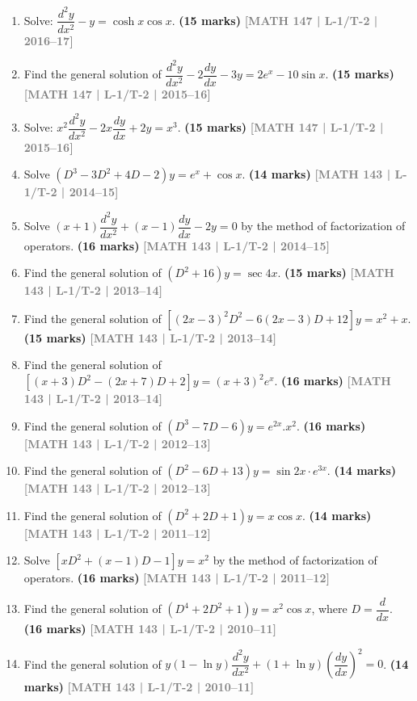 \documentclass[12pt,a4paper]{article}
\newcommand{\yr}[1]{\hfill\textcolor{gray}{\small\textbf{[#1]}}}
\newcommand{\mk}[1]{\textcolor{orange!70!black}{\small\textbf{(#1 marks)}}}
\begin{document}
\begin{enumerate}
\item Solve: $\dfrac{d^{2}y}{dx^{2}}-y=\cosh x\cos x$.
\mk{15} \yr{MATH 147 | L-1/T-2 | 2016--17}

\item Find the general solution of $\dfrac{d^{2}y}{dx^{2}}-2\dfrac{dy}{dx}-3y=2e^{x}-10\sin x$.
\mk{15} \yr{MATH 147 | L-1/T-2 | 2015--16}

\item Solve: $x^{2}\dfrac{d^{2}y}{dx^{2}}-2x\dfrac{dy}{dx}+2y=x^{3}$.
\mk{15} \yr{MATH 147 | L-1/T-2 | 2015--16}

\item Solve $(D^{3}-3D^{2}+4D-2)y=e^{x}+\cos x$.
\mk{14} \yr{MATH 143 | L-1/T-2 | 2014--15}

\item Solve $(x+1)\dfrac{d^{2}y}{dx^{2}}+(x-1)\dfrac{dy}{dx}-2y=0$ by the method of factorization of operators.
\mk{16} \yr{MATH 143 | L-1/T-2 | 2014--15}

\item Find the general solution of $(D^{2}+16)y=\sec 4x$.
\mk{15} \yr{MATH 143 | L-1/T-2 | 2013--14}

\item Find the general solution of $[(2x-3)^{2}D^{2}-6(2x-3)D+12]y=x^{2}+x$.
\mk{15} \yr{MATH 143 | L-1/T-2 | 2013--14}

\item Find the general solution of $[(x+3)D^{2}-(2x+7)D+2]y=(x+3)^{2}e^{x}$.
\mk{16\textonehalf} \yr{MATH 143 | L-1/T-2 | 2013--14}

\item Find the general solution of $(D^{3}-7D-6)y=e^{2x}.x^{2}$.
\mk{16\textonehalf} \yr{MATH 143 | L-1/T-2 | 2012--13}

\item Find the general solution of $(D^{2}-6D+13)y=\sin 2x\cdot e^{3x}$.
\mk{14} \yr{MATH 143 | L-1/T-2 | 2012--13}

\item Find the general solution of $(D^{2}+2D+1)y=x\cos x$.
\mk{14} \yr{MATH 143 | L-1/T-2 | 2011--12}

\item Solve $[xD^{2}+(x-1)D-1]y=x^{2}$ by the method of factorization of operators.
\mk{16\textonehalf} \yr{MATH 143 | L-1/T-2 | 2011--12}

\item Find the general solution of $(D^{4}+2D^{2}+1)y=x^{2}\cos x$, where $D=\dfrac{d}{dx}$.
\mk{16} \yr{MATH 143 | L-1/T-2 | 2010--11}

\item Find the general solution of $y(1-\ln y)\dfrac{d^{2}y}{dx^{2}}+(1+\ln y)\left(\dfrac{dy}{dx}\right)^{2}=0$.
\mk{14} \yr{MATH 143 | L-1/T-2 | 2010--11}

\end{enumerate}
\end{document}
